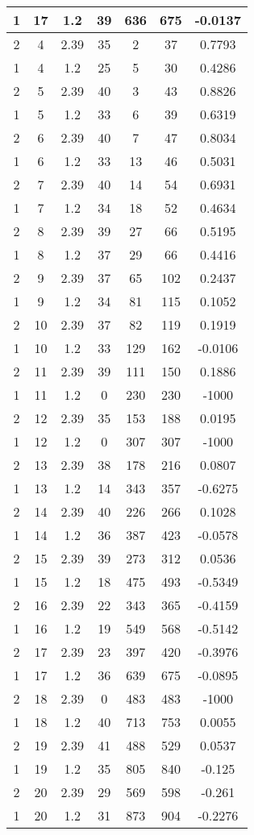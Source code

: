\documentclass[letterpaper, 12pt]{article}
\begin{document}
\begin{longtable}{|c|c|c|c|c|c|c|}
\hline
1 & 17 & 1.2 & 39 & 636 & 675 & -0.0137 \\
\hline
2 & 4 & 2.39 & 35 & 2 & 37 & 0.7793 \\
\hline
1 & 4 & 1.2 & 25 & 5 & 30 & 0.4286 \\
\hline
2 & 5 & 2.39 & 40 & 3 & 43 & 0.8826 \\
\hline
1 & 5 & 1.2 & 33 & 6 & 39 & 0.6319 \\
\hline
2 & 6 & 2.39 & 40 & 7 & 47 & 0.8034 \\
\hline
1 & 6 & 1.2 & 33 & 13 & 46 & 0.5031 \\
\hline
2 & 7 & 2.39 & 40 & 14 & 54 & 0.6931 \\
\hline
1 & 7 & 1.2 & 34 & 18 & 52 & 0.4634 \\
\hline
2 & 8 & 2.39 & 39 & 27 & 66 & 0.5195 \\
\hline
1 & 8 & 1.2 & 37 & 29 & 66 & 0.4416 \\
\hline
2 & 9 & 2.39 & 37 & 65 & 102 & 0.2437 \\
\hline
1 & 9 & 1.2 & 34 & 81 & 115 & 0.1052 \\
\hline
2 & 10 & 2.39 & 37 & 82 & 119 & 0.1919 \\
\hline
1 & 10 & 1.2 & 33 & 129 & 162 & -0.0106 \\
\hline
2 & 11 & 2.39 & 39 & 111 & 150 & 0.1886 \\
\hline
1 & 11 & 1.2 & 0 & 230 & 230 & -1000 \\
\hline
2 & 12 & 2.39 & 35 & 153 & 188 & 0.0195 \\
\hline
1 & 12 & 1.2 & 0 & 307 & 307 & -1000 \\
\hline
2 & 13 & 2.39 & 38 & 178 & 216 & 0.0807 \\
\hline
1 & 13 & 1.2 & 14 & 343 & 357 & -0.6275 \\
\hline
2 & 14 & 2.39 & 40 & 226 & 266 & 0.1028 \\
\hline
1 & 14 & 1.2 & 36 & 387 & 423 & -0.0578 \\
\hline
2 & 15 & 2.39 & 39 & 273 & 312 & 0.0536 \\
\hline
1 & 15 & 1.2 & 18 & 475 & 493 & -0.5349 \\
\hline
2 & 16 & 2.39 & 22 & 343 & 365 & -0.4159 \\
\hline
1 & 16 & 1.2 & 19 & 549 & 568 & -0.5142 \\
\hline
2 & 17 & 2.39 & 23 & 397 & 420 & -0.3976 \\
\hline
1 & 17 & 1.2 & 36 & 639 & 675 & -0.0895 \\
\hline
2 & 18 & 2.39 & 0 & 483 & 483 & -1000 \\
\hline
1 & 18 & 1.2 & 40 & 713 & 753 & 0.0055 \\
\hline
2 & 19 & 2.39 & 41 & 488 & 529 & 0.0537 \\
\hline
1 & 19 & 1.2 & 35 & 805 & 840 & -0.125 \\
\hline
2 & 20 & 2.39 & 29 & 569 & 598 & -0.261 \\
\hline
1 & 20 & 1.2 & 31 & 873 & 904 & -0.2276 \\
\hline
\end{longtable}
\end{document}
